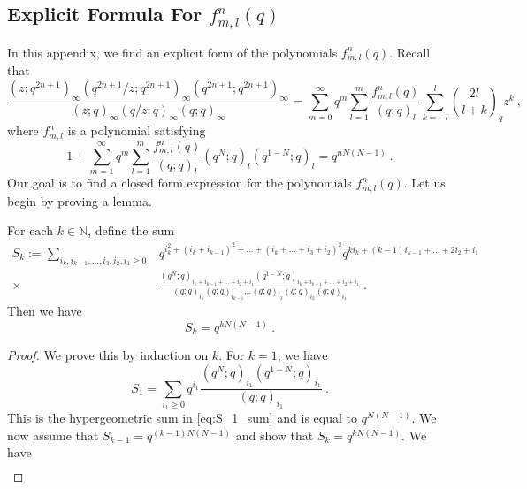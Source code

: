 \documentclass[a4paper,10pt]{article}
\begin{document}
\begin{appendix}
\section{Explicit Formula For $f^n_{m,l}(q)$}\label{app:new_id}    
In this appendix, we find an explicit form of the polynomials $f_{m,l}^n(q)$.
Recall that  
\begin{equation}\label{eq:main_id_gen_app}
\frac{\left(z ; q^{2n+1}\right)_{\infty}\left(q^{2n+1} / z ; q^{2n+1}\right)_{\infty}\left(q^{2n+1} ; q^{2n+1}\right)_{\infty}}{(z ; q)_{\infty}(q / z ; q)_{\infty}(q ; q)_{\infty}}=\sum_{m=0}^{\infty}q^m\sum_{l=1}^m \frac{f^n_{m,l}(q)}{(q ; q)_l} \sum_{k=-l}^l{
2 l \choose
l+k}_q z^k~,    
\end{equation}
where $f^n_{m,l}$ is a polynomial satisfying 
\begin{equation}\label{eq:fmnl_def_app}
    1 + \sum_{m=1}^\infty q^m \sum_{l=1}^m 
    \frac{f^n_{m,l}(q)}{(q;q)_l} (q^N; q)_l 
    (q^{1-N};q)_l = q^{nN(N-1)}~.
\end{equation}
Our goal is to find a closed form expression for the polynomials $f_{m,l}^n(q)$. Let us begin by proving a lemma.
\begin{lemma}\label{lemma:S_kqN_rel}
For each $k\in\mathds{N}$, define the sum
\begin{equation}
\begin{split}
    S_k:=\sum_{i_k,i_{k-1},\dots,i_3,i_2,i_1\geq 0}&q^{i_k^2+(i_k+i_{k-1})^2+\dots+(i_k+\dots+i_3+i_2)^2}q^{ki_k+(k-1)i_{k-1}+\dots+2i_2+i_1}
    \\
    \times&\frac{(q^N;q)_{i_k+i_{k-1}+\dots +i_2+i_1}(q^{1-N};q)_{i_k+i_{k-1}+\dots +i_2+i_1}}{(q;q)_{i_k}(q;q)_{i_{k-1}}\dots (q;q)_{i_3}(q;q)_{i_2}(q;q)_{i_1}}~.
\end{split}    
\end{equation}
Then we have 
\begin{equation}
    S_k=q^{kN(N-1)}~.
\end{equation}
\end{lemma}
\begin{proof}
We prove this by induction on $k$. For $k=1$, we have 
\begin{equation}
    S_1=\sum_{i_1\geq 0}q^{i_1}\frac{(q^N;q)_{i_1}(q^{1-N};q)_{i_1}}{(q;q)_{i_1}}~.
\end{equation}
This is the hypergeometric sum in \eqref{eq:S_1_sum} and is equal to $q^{N(N-1)}$. We now assume that $S_{k-1}=q^{(k-1)N(N-1)}$ and show that $S_{k}=q^{kN(N-1)}$. We have 
\begin{equation}
\begin{split}

\end{split}
\end{equation}
\end{proof}
\end{appendix}
\end{document}
